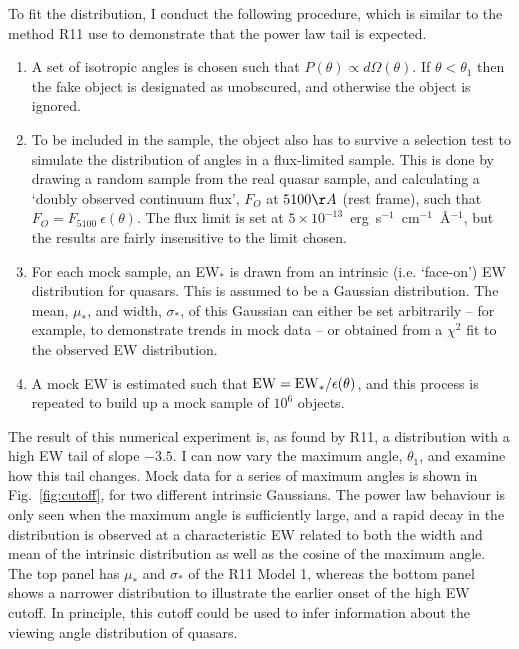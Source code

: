 To fit the distribution, I conduct the following procedure,
which is similar to the method R11 use to demonstrate that the power
law tail is expected.
\begin{enumerate}
	\setlength\itemsep{1em}
	\item A set of isotropic angles is chosen such that 
	$P(\theta)\propto d\Omega(\theta)$. 
	If $\theta<\theta_{1}$ then the fake object is designated as unobscured, 
	and otherwise the object is ignored. 
	\item To be included in the sample, the object also has to 
	survive a selection test
	to simulate the distribution of angles in a flux-limited sample.
	This is done by drawing a random sample from the real quasar sample, 
	and calculating a `doubly observed continuum flux', $F_O$ at $5100\AA$ 
	(rest frame), such that $F_O = F_{5100}~\epsilon(\theta)$. The flux limit
	is set at $5\times10^{-13}$~erg~s$^{-1}$~cm$^{-1}$~\AA$^{-1}$, but the results
	are fairly insensitive to the limit chosen.
	\item For each mock sample, an EW$_*$ is drawn from an intrinsic 
	(i.e. `face-on') EW distribution for quasars. This is assumed to be a
	Gaussian distribution. The mean, $\mu_*$, and width, $\sigma_*$, of this Gaussian
	can either be set arbitrarily -- for example, to demonstrate trends
	in mock data -- or obtained from a $\chi^2$ fit to the observed EW
	distribution.
	\item A mock EW is estimated such that ${\rm EW} = {\rm EW}_* / \epsilon(\theta)$,
	and this process is repeated to build up a mock sample of $10^6$ objects.
\end{enumerate}
The result of this numerical experiment is, as found by R11, a distribution
with a high EW tail of slope $-3.5$. I can now vary the maximum angle, $\theta_1$,
and examine how this tail changes. Mock data for a series
of maximum angles is shown in Fig.~\ref{fig:cutoff}, for two different intrinsic 
Gaussians. The power law behaviour is only seen when the maximum angle is
sufficiently large, and a rapid decay in the distribution is observed
at a characteristic EW related to both the width and mean of the
intrinsic distribution as well as the cosine of the maximum angle.
The top panel has $\mu_*$ and $\sigma_*$ of the R11 Model 1, 
whereas the bottom panel shows a narrower distribution to illustrate the 
earlier onset of the high EW cutoff. In principle, this cutoff could
be used to infer information about the viewing angle distribution
of quasars.

